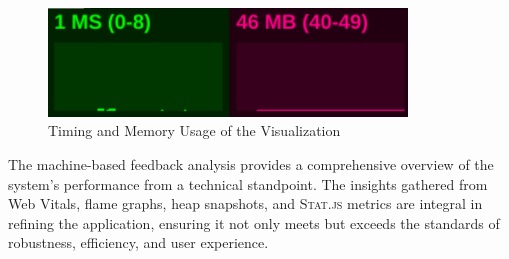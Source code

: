 \begin{figure}[htbp]
  \centering
  \includegraphics[width=0.85\textwidth]{Pictures/stats}
  \caption{\label{fig:stats}Timing and Memory Usage of the Visualization}
\end{figure}

The machine-based feedback analysis provides a comprehensive overview of the system's performance from a technical standpoint. The insights gathered from Web Vitals, flame graphs, heap snapshots, and \textsc{Stat.js} metrics are integral in refining the application, ensuring it not only meets but exceeds the standards of robustness, efficiency, and user experience.
